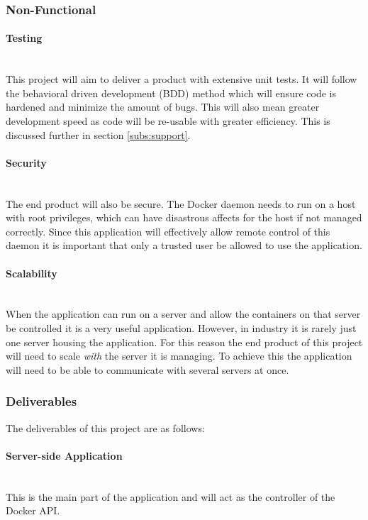 \documentclass{article}
\begin{document}
\subsubsection{Non-Functional}

\paragraph{Testing}\mbox{}\\
This project will aim to deliver a product with extensive unit tests. It will follow the behavioral driven development (BDD) method which will ensure code is hardened and minimize the amount of bugs. This will also mean greater development speed as code will be re-usable with greater efficiency. This is discussed further in section \ref{subs:support}.

\paragraph{Security}\mbox{}\\
The end product will also be secure. The Docker daemon needs to run on a host with root privileges, which can have disastrous affects for the host if not managed correctly. Since this application will effectively allow remote control of this daemon it is important that only a trusted user be allowed to use the application. 

\paragraph{Scalability}\mbox{}\\
When the application can run on a server and allow the containers on that server be controlled it is a very useful application. However, in industry it is rarely just one server housing the application. For this reason the end product of this project will need to scale \textit{with} the server it is managing. To achieve this the application will need to be able to communicate with several servers at once.

\subsubsection{Deliverables}
The deliverables of this project are as follows:

\paragraph{Server-side Application}\mbox{}\\
This is the main part of the application and will act as the controller of the Docker API.
\end{document}

